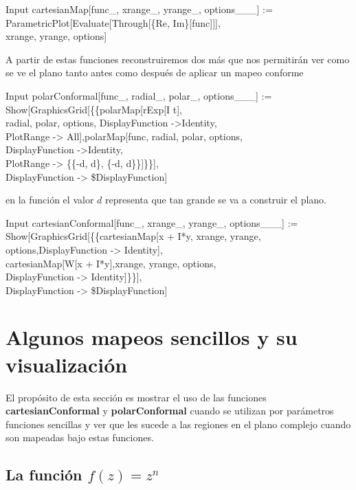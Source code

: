 \begin{mmaCell}{Input}
  cartesianMap[func_, xrange_, yrange_, options___] := \\ParametricPlot[Evaluate[Through[\{Re, Im\}[func]]],\\ xrange, yrange, options]
\end{mmaCell}

A partir de estas funciones reconstruiremos dos más que nos permitirán ver como se ve el plano tanto antes como después de aplicar un mapeo conforme
\begin{mmaCell}{Input}
	 polarConformal[func_, radial_, polar_, options___] :=\\Show[GraphicsGrid[\{\{polarMap[rExp[I t],\\radial, polar, options, DisplayFunction ->Identity,\\PlotRange -> All],polarMap[func, radial, polar, options,\\DisplayFunction ->Identity,\\PlotRange -> \{\{-d, d\}, \{-d, d\}\}]\}\}],\\DisplayFunction -> \$DisplayFunction]
\end{mmaCell}
en la función el valor $d$ representa que tan grande se va a construir el plano.
\begin{mmaCell}{Input}
	 cartesianConformal[func_, xrange_, yrange_, options___] :=\\Show[GraphicsGrid[\{\{cartesianMap[x + I*y, xrange, yrange,\\options,DisplayFunction -> Identity],\\cartesianMap[W[x + I*y],xrange, yrange, options,\\DisplayFunction -> Identity]\}\}],\\DisplayFunction -> \$DisplayFunction]
\end{mmaCell}


\section{Algunos mapeos sencillos y su visualización} \label{mum}
El propósito de esta sección es mostrar el uso de las funciones \textbf{cartesianConformal} y \textbf{polarConformal} cuando se utilizan por parámetros funciones sencillas y ver que les sucede a las regiones en el plano complejo cuando son mapeadas bajo estas funciones. 
\subsection{La función $f(z)=z^n$}

